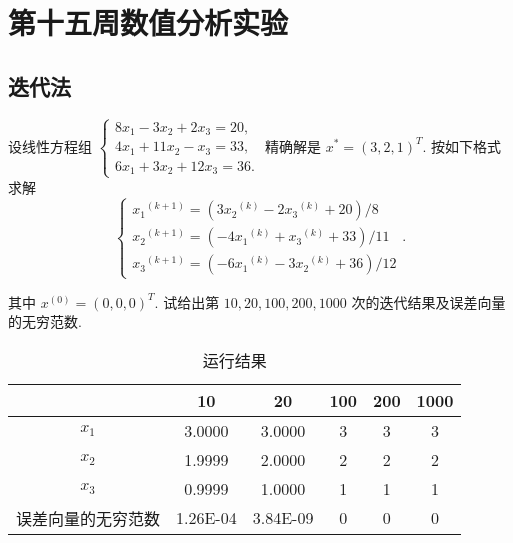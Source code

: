 \section{第十五周数值分析实验}
\subsection{迭代法}
\begin{ex}
设线性方程组 $\left\{\begin{array}{l}8 x_1-3 x_2+2 x_3=20, \\ 4 x_1+11 x_2-x_3=33, \\ 6 x_1+3 x_2+12 x_3=36 .\end{array}\right.$ 精确解是 $x^*=(3,2,1)^T$. 按如下格式求解
$$
\left\{\begin{array}{l}
	x_1{ }^{(k+1)}=\left(3 x_2{ }^{(k)}-2 x_3{ }^{(k)}+20\right) / 8 \\
	x_2{ }^{(k+1)}=\left(-4 x_1{ }^{(k)}+x_3{ }^{(k)}+33\right) / 11 \\
	x_3{ }^{(k+1)}=\left(-6 x_1{ }^{(k)}-3 x_2{ }^{(k)}+36\right) / 12
\end{array}\right. .
$$

其中 $x^{(0)}=(0,0,0)^T$. 试给出第 $10,20,100,200,1000$ 次的迭代结果及误差向量的无穷范数.
\end{ex}

\qa 
\begin{table}[H]
	\centering
	\caption{运行结果}
	\begin{tabular}{c|ccccc}
		& 10    & 20    & 100   & 200   & 1000 \\
		\hline
		$x_1$    & 3.0000 &3.0000& 3     & 3     & 3 \\
		$x_2$    &1.9999& 2.0000& 2     & 2     & 2 \\
		$x_3$    & 0.9999 & 1.0000 & 1     & 1     & 1 \\
		误差向量的无穷范数 &1.26E-04 & 3.84E-09 & 0     & 0     & 0 \\
	\end{tabular}%
	\label{tab:addlabelw15-1}%
\end{table}%

